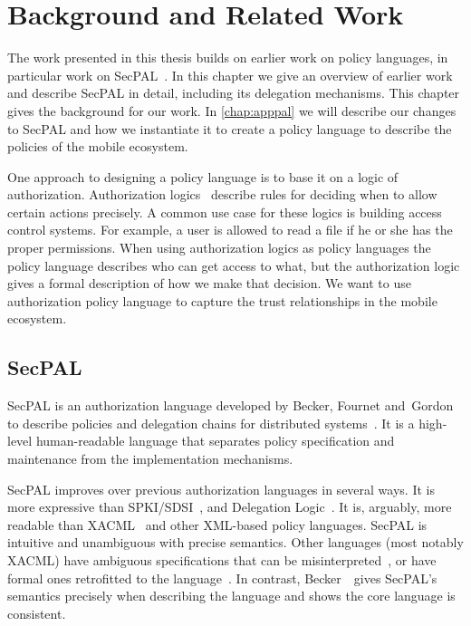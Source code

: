 \documentclass[thesis.tex]{subfiles}
\begin{document}
\chapter{Background and Related Work}
\label{chap:background}

The work presented in this thesis builds on earlier work on policy
languages, in particular work on SecPAL~\cite{becker_secpal:_2006}. In
this chapter we give an overview of earlier work and describe SecPAL
in detail, including its delegation mechanisms. This chapter gives the
background for our work. In \autoref{chap:apppal} we will describe our
changes to SecPAL and how we instantiate it to create a policy
language to describe the policies of the mobile ecosystem.

One approach to designing a policy language is to base it on a logic
of authorization. Authorization logics~\cite{abadi_calculus_1991}
describe rules for deciding when to allow certain actions precisely. A
common use case for these logics is building access control systems. For example, a
user is allowed to read a file if he or she has the proper
permissions. When using authorization logics as policy languages
the policy language describes who can get access to what, but the
authorization logic gives a formal description of how we make that
decision. We want to use authorization policy language to capture the
trust relationships in the mobile ecosystem.

\section{SecPAL}

SecPAL is an authorization language developed by Becker, Fournet
and~Gordon to describe policies and delegation chains for distributed
systems~\cite{becker_secpal:_2006}. It is a high-level human-readable
language that separates policy specification and maintenance from the
implementation mechanisms.

SecPAL improves over previous authorization languages in several
ways. It is more expressive than
SPKI/SDSI~\cite{ellison_spki_1999}, and Delegation
Logic~\cite{li_delegation_2003}. It is, arguably, more readable than
XACML~\cite{oasis_extensible_2013} and other XML-based policy
languages.  SecPAL is intuitive and unambiguous with precise
semantics. Other languages (most notably XACML) have ambiguous
specifications that can be misinterpreted~\cite{ramli_logic_2014}, or
have formal ones retrofitted to the
language~\cite{bryans_reasoning_2005,masi_formalisation_2012}.  In
contrast, Becker~\etal~gives SecPAL's semantics precisely when
describing the language and shows the core language is consistent.
\end{document}
